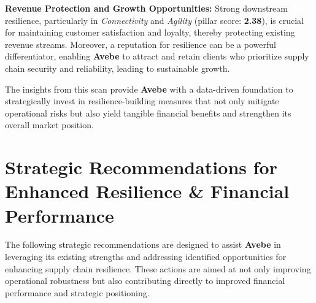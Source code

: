 \documentclass[
  oneside,
  open=any,
  fontsize=11pt]{scrbook}
\begin{document}
\textbf{Revenue Protection and Growth Opportunities:} Strong downstream
resilience, particularly in \emph{Connectivity} and \emph{Agility}
(pillar score: \textbf{2.38}), is crucial for maintaining customer
satisfaction and loyalty, thereby protecting existing revenue streams.
Moreover, a reputation for resilience can be a powerful differentiator,
enabling \textbf{Avebe} to attract and retain clients who prioritize
supply chain security and reliability, leading to sustainable growth.

The insights from this scan provide \textbf{Avebe} with a data-driven
foundation to strategically invest in resilience-building measures that
not only mitigate operational risks but also yield tangible financial
benefits and strengthen its overall market position.

\chapter{Strategic Recommendations for Enhanced Resilience \& Financial
Performance}\label{strategic-recommendations-for-enhanced-resilience-financial-performance}

The following strategic recommendations are designed to assist
\textbf{Avebe} in leveraging its existing strengths and addressing
identified opportunities for enhancing supply chain resilience. These
actions are aimed at not only improving operational robustness but also
contributing directly to improved financial performance and strategic
positioning.
\end{document}
